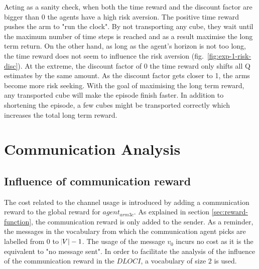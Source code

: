 Acting as a sanity check, when both the time reward and the discount factor are bigger than $0$ the agents have a high risk aversion. The positive time reward pushes the arm to "run the clock". By not transporting any cube, they wait until the maximum number of time steps is reached and as a result maximise the long term return. On the other hand, as long as the agent's horizon is not too long, the time reward does not seem to influence the risk aversion (fig.~\ref{fig:exp-1-risk-disc}). At the extreme, the discount factor of $0$  the time reward only shifts all Q estimates by the same amount. As the discount factor gets closer to 1, the arms become more risk seeking. With the goal of maximising the long term reward, any transported cube will make the episode finish faster. In addition to shortening the episode, a few cubes might be transported correctly which increases the total long term reward. 


\section{Communication Analysis}

\subsection{Influence of communication reward}

The cost related to the channel usage is introduced by adding a communication reward to the global reward for $agent_{arm3c}$. As explained in section \ref{sec:reward-function}, the communication reward is only added to the sender. As a reminder, the messages in the vocabulary from which the communication agent picks are labelled from $0$ to $\abs{V} - 1$. The usage of the message $v_0$ incurs no cost as it is the equivalent to "no message sent". In order to facilitate the analysis of the influence of the communication reward in the $DLOCI$, a vocabulary of size $2$ is used. 

